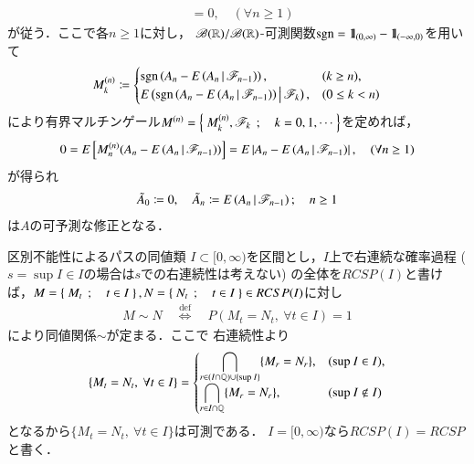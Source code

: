 \begin{prf}
\begin{align}
			&= 0,
			\quad (\forall n \geq 1)
		\end{align}
		が従う．ここで各$n \geq 1$に対し，
		$\mathscr{B}(\mathbb{R})/\mathscr{B}(\mathbb{R})$-可測関数$\operatorname{sgn} = \mbox{1}\hspace{-0.25em}\mbox{l}_{(0,\infty)} - \mbox{1}\hspace{-0.25em}\mbox{l}_{(-\infty,0)}$を用いて
		\begin{align}
			M^{(n)}_k \coloneqq 
			\begin{cases}
				\operatorname{sgn}\left( A_n - E\left( A_n \, \middle|\, \mathscr{F}_{n-1} \right) \right), & (k \geq n), \\
				E\left( \operatorname{sgn}\left( A_n - E\left( A_n \, \middle|\, \mathscr{F}_{n-1} \right) \right) \, \middle|\, \mathscr{F}_k \right), & (0 \leq k < n)
			\end{cases}
		\end{align}
		により有界マルチンゲール$M^{(n)} = \left\{\ M^{(n)}_k,\mathscr{F}_k\ \, ; \quad k=0,1,\cdots\ \right\}$を定めれば，
		\begin{align}
			0 = E\left[ M^{(n)}_n(A_n - E\left( A_n \, \middle|\, \mathscr{F}_{n-1} \right)) \right] 
			= E\left| A_n - E\left( A_n \, \middle|\, \mathscr{F}_{n-1} \right) \right|,
			\quad (\forall n \geq 1)
		\end{align}
		が得られ
		\begin{align}
			\tilde{A}_0 \coloneqq 0,
			\quad \tilde{A}_n \coloneqq E\left( A_n \, \middle|\, \mathscr{F}_{n-1} \right); \quad n \geq 1
		\end{align}
		は$A$の可予測な修正となる．
		\QED
	\end{prf}
	
	\begin{itembox}[l]{区別不能性によるパスの同値類}
		$I \subset [0,\infty)$を区間とし，$I$上で右連続な確率過程
		($s=\sup{}{I} \in I$の場合は$s$での右連続性は考えない)
		の全体を$RCSP(I)$と書けば，$M = \left\{\ M_t\ \, ; \quad t \in I\ \right\},N = \left\{\ N_t\ \, ; \quad t \in I\ \right\} \in RCSP(I)$に対し
		\begin{align}
			M \sim N \quad \overset{\mathrm{def}}{\Longleftrightarrow} \quad 
			P(M_t = N_t,\ \forall t \in I) = 1
			\label{eq:equivalence_with_respect_to_path}
		\end{align}
		により同値関係$\sim$が定まる．ここで
		右連続性より
		\begin{align}
			\{M_t = N_t,\ \forall t \in I\} = 
			\begin{cases}
				\displaystyle \bigcap_{r \in (I \cap \mathbb{Q}) \cup \{\operatorname*{sup}_{} I\}}\{M_r = N_r\}, & (\operatorname*{sup}_{} I \in I), \\
				\displaystyle \bigcap_{r \in I \cap \mathbb{Q}}\{M_r = N_r\}, & (\operatorname*{sup}_{} I \notin I)
			\end{cases}
		\end{align}
		となるから$\{M_t = N_t,\ \forall t \in I\}$は可測である．
		$I = [0,\infty)$なら$RCSP(I) = RCSP$と書く．
	\end{itembox}
	
